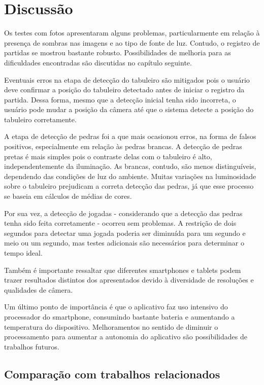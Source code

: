 \section{Discussão}

Os testes com fotos apresentaram alguns problemas, particularmente em relação à presença de sombras nas imagens e ao tipo de fonte de luz. Contudo, o registro de partidas se mostrou bastante robusto. Possibilidades de melhoria para as dificuldades encontradas são discutidas no capítulo seguinte.

Eventuais erros na etapa de detecção do tabuleiro são mitigados pois o usuário deve confirmar a posição do tabuleiro detectado antes de iniciar o registro da partida. Dessa forma, mesmo que a detecção inicial tenha sido incorreta, o usuário pode mudar a posição da câmera até que o sistema detecte a posição do tabuleiro corretamente.

A etapa de detecção de pedras foi a que mais ocasionou erros, na forma de falsos positivos, especialmente em relação às pedras brancas. A detecção de pedras pretas é mais simples pois o contraste delas com o tabuleiro é alto, independentemente da iluminação. As brancas, contudo, são menos distinguíveis, dependendo das condições de luz do ambiente. Muitas variações na luminosidade sobre o tabuleiro prejudicam a correta detecção das pedras, já que esse processo se baseia em cálculos de médias de cores. %

Por sua vez, a detecção de jogadas - considerando que a detecção das pedras tenha sido feita corretamente - ocorreu sem problemas. A restrição de dois segundos para detectar uma jogada poderia ser diminuída para um segundo e meio ou um segundo, mas testes adicionais são necessários para determinar o tempo ideal.

Também é importante ressaltar que diferentes smartphones e tablets podem trazer resultados distintos dos apresentados devido à diversidade de resoluções e qualidades de câmera.

Um último ponto de importância é que o aplicativo faz uso intensivo do processador do smartphone, consumindo bastante bateria e aumentando a temperatura do dispositivo. Melhoramentos no sentido de diminuir o processamento para aumentar a autonomia do aplicativo são possibilidades de trabalhos futuros.

\subsection{Comparação com trabalhos relacionados}

